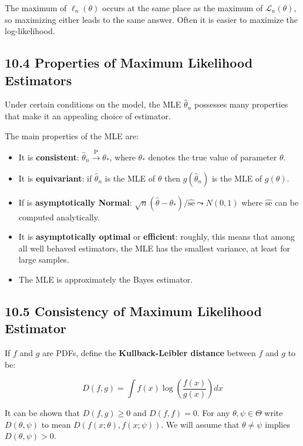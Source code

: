 The maximum of \(\ell_{n}(\theta)\) occurs at the same place as the
maximum of \(\mathcal{L}_{n}(\theta)\), so maximizing either leads to the
same answer. Often it is easier to maximize the log-likelihood.

\subsection*{10.4 Properties of Maximum Likelihood
Estimators}\label{properties-of-maximum-likelihood-estimators}

Under certain conditions on the model, the MLE \(\hat{\theta}_{n}\)
possesses many properties that make it an appealing choice of estimator.

The main properties of the MLE are:

\begin{itemize}[tightlist]
\item
  It is \textbf{consistent}:
  \(\hat{\theta}_{n} \xrightarrow{\text{P}} \theta_*\), where \(\theta_*\)
  denotes the true value of parameter \(\theta\).
\item
  It is \textbf{equivariant}: if \(\hat{\theta}_{n}\) is the MLE of
  \(\theta\) then \(g(\hat{\theta}_{n})\) is the MLE of \(g(\theta)\).
\item
  If is \textbf{asymptotically Normal}:
  \(\sqrt{n}(\hat{\theta} - \theta_*) / \hat{\text{se}} \leadsto N(0, 1)\)
  where \(\hat{\text{se}}\) can be computed analytically.
\item
  It is \textbf{asymptotically optimal} or \textbf{efficient}: roughly,
  this means that among all well behaved estimators, the MLE has the
  smallest variance, at least for large samples.
\item
  The MLE is approximately the Bayes estimator.
\end{itemize}

\subsection*{10.5 Consistency of Maximum Likelihood
Estimator}\label{consistency-of-maximum-likelihood-estimator}

If \(f\) and \(g\) are PDFs, define the \textbf{Kullback-Leibler
distance} between \(f\) and \(g\) to be:

\[ D(f, g) = \int f(x) \log \left( \frac{f(x)}{g(x)} \right) dx \]

It can be shown that \(D(f, g) \geq 0\) and \(D(f, f) = 0\). For any
\(\theta, \psi \in \Theta\) write \(D(\theta, \psi)\) to mean
\(D(f(x; \theta), f(x; \psi))\). We will assume that
\(\theta \neq \psi\) implies \(D(\theta, \psi) > 0\).

